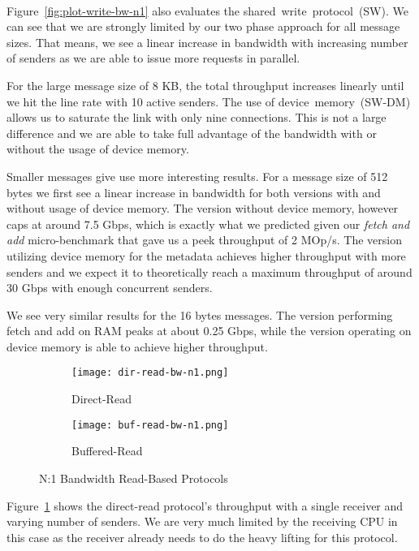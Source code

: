 \paragraph{} Figure~\ref{fig:plot-write-bw-n1} also evaluates the \mbox{shared write protocol (SW)}. We can see that we are strongly limited
by our two phase approach for all message sizes. That means, we see a linear increase in bandwidth with increasing number of 
senders as we are able to issue more requests in parallel.

For the large message size of 8 KB, the total throughput increases linearly until we hit the line rate with 10 
active senders. The use of \mbox{device memory (SW-DM)} allows us to saturate the link with only nine connections.
This is not a 
large difference and we are able to take full advantage of the bandwidth with or without the usage of device memory.

Smaller messages give use more interesting results. For a message size of 512 bytes we first see a linear 
increase in bandwidth for both versions with and without usage of device memory. The version without device memory, however
caps at around 7.5 Gbps, which is exactly what we predicted given our \emph{fetch and add} micro-benchmark that gave us a
peek throughput of 2 MOp/s. The version utilizing device memory for the metadata achieves higher throughput with more
senders and we expect it to theoretically reach a maximum throughput of around 30 Gbps with enough concurrent senders.

We see very similar results for the 16 bytes messages. The version performing fetch and add on RAM peaks at about 0.25 Gbps, 
while the version operating on device memory is able to achieve higher throughput.



\begin{figure}[ht]
  \begin{subfigure}[b]{0.49\textwidth}
  \centering
  \texttt{[image: dir-read-bw-n1.png]}
  \caption{Direct-Read}
  \label{fig:plot-dirread-bw-n1}
  \end{subfigure}
  \begin{subfigure}[b]{0.49\textwidth}
  \centering
  \texttt{[image: buf-read-bw-n1.png]}
  \caption{Buffered-Read}
  \label{fig:plot-bufread-bw-n1}
  \end{subfigure}
  \caption{N:1 Bandwidth Read-Based Protocols}
\end{figure}

Figure~\ref{fig:plot-dirread-bw-n1} shows the direct-read protocol's throughput with a single receiver and varying number of senders.
We are very much limited by the receiving CPU in this case as the receiver already needs to do the heavy lifting for 
this protocol. 

